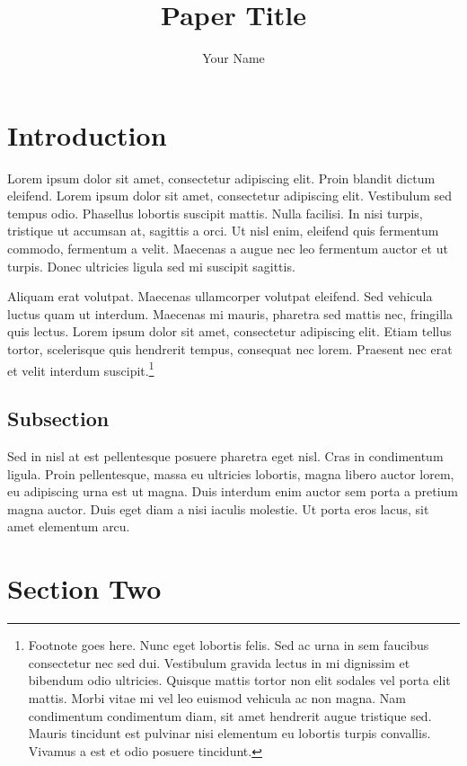 \documentclass{carver-cyberlaw}
\title{Paper Title}
\author{Your Name}
\begin{document}
\maketitle
\thispagestyle{fancy} %

\section{Introduction}

Lorem ipsum dolor sit amet, consectetur adipiscing elit. Proin blandit dictum 
eleifend. Lorem ipsum dolor sit amet, consectetur adipiscing elit. Vestibulum 
sed tempus odio. Phasellus lobortis suscipit mattis. Nulla facilisi. In nisi 
turpis, tristique ut accumsan at, sagittis a orci. Ut nisl enim, eleifend quis 
fermentum commodo, fermentum a velit. Maecenas a augue nec leo fermentum 
auctor et ut turpis. Donec ultricies ligula sed mi suscipit sagittis.

Aliquam erat volutpat. Maecenas ullamcorper volutpat eleifend. Sed vehicula 
luctus quam ut interdum. Maecenas mi mauris, pharetra sed mattis nec, 
fringilla quis lectus. Lorem ipsum dolor sit amet, consectetur adipiscing 
elit. Etiam tellus tortor, scelerisque quis hendrerit tempus, consequat nec 
lorem. Praesent nec erat et velit interdum suscipit.\footnote{Footnote goes 
here. Nunc eget lobortis felis. Sed ac urna in sem faucibus consectetur nec 
sed dui. Vestibulum gravida lectus in mi dignissim et bibendum odio ultricies. 
Quisque mattis tortor non elit sodales vel porta elit mattis. Morbi vitae mi 
vel leo euismod vehicula ac non magna. Nam condimentum condimentum diam, sit 
amet hendrerit augue tristique sed. Mauris tincidunt est pulvinar nisi 
elementum eu lobortis turpis convallis. Vivamus a est et odio posuere 
tincidunt.}

\subsection{Subsection}

Sed in nisl at est pellentesque posuere pharetra eget nisl. Cras in 
condimentum ligula. Proin pellentesque, massa eu ultricies lobortis, magna 
libero auctor lorem, eu adipiscing urna est ut magna. Duis interdum enim 
auctor sem porta a pretium magna auctor. Duis eget diam a nisi iaculis 
molestie. Ut porta eros lacus, sit amet elementum arcu.

\section{Section Two}
\end{document}
